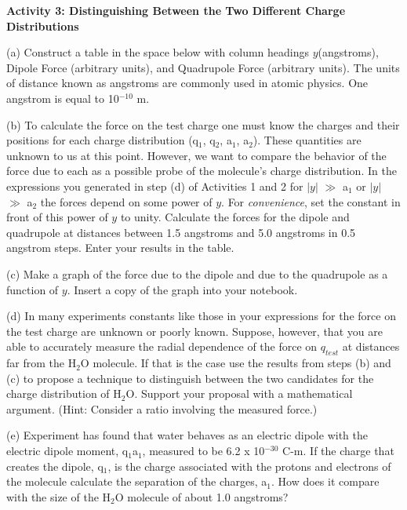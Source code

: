 \textbf{Activity 3: Distinguishing Between the Two Different Charge
Distributions} 

(a) Construct a table in the space below with column headings \( y \)(angstroms),
Dipole Force (arbitrary units), and Quadrupole Force (arbitrary units).
The units of distance known as angstroms are commonly used in atomic
physics. One angstrom is equal to 10\( ^{-10} \) m.
\vspace{40mm}

(b) To calculate the force on the test charge one must know the charges
and their positions for each charge distribution (q\( _{1} \), q\( _{2} \),
a\( _{1} \), a\( _{2} \)). These quantities are unknown to us at
this point. However, we want to compare the behavior of the force
due to each as a possible probe of the molecule's charge distribution.
In the expressions you generated in step (d) of Activities 1 and 2
for \( \left| y\right|  \) \( \gg  \) a\( _{1} \) or \( \left| y\right|  \)
\( \gg  \) a\( _{2} \) the forces depend on some power of \( y \). For
\emph{convenience}, set the constant in front of this power of \( y \) to
unity. Calculate the forces for the dipole and quadrupole at distances
between 1.5 angstroms and 5.0 angstroms in 0.5 angstrom steps. Enter
your results in the table.

(c) Make a graph of the force due to the dipole and due to the quadrupole
as a function of \( y \). Insert a copy of the graph into your notebook.

(d) In many experiments constants like those in your expressions for
the force on the test charge are unknown or poorly known. Suppose,
however, that you are able to accurately measure the radial dependence
of the force on $q_{test}$ at distances far from the H\( _{2} \)O
molecule. If that is the case use the results from steps (b) and (c)
to propose a technique to distinguish between the two candidates for
the charge distribution of H\( _{2} \)O. Support your proposal with
a mathematical argument. (Hint: Consider a ratio involving the measured
force.)
\vspace{40mm}

(e) Experiment has found that water behaves as an electric dipole
with the electric dipole moment, q\( _{1} \)a\( _{1} \), measured
to be 6.2 x 10\( ^{-30} \) C-m. If the charge that creates the dipole,
q\( _{1} \), is the charge associated with the protons and electrons
of the molecule calculate the separation of the charges, a\( _{1} \).
How does it compare with the size of the H\( _{2} \)O molecule of
about 1.0 angstroms?\vspace{40mm}

